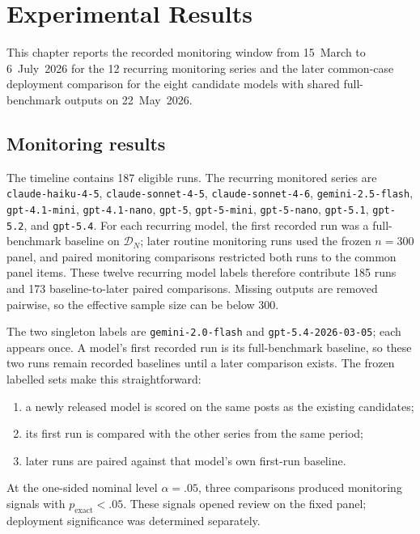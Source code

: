 \chapter{Experimental Results}
\label{chap:experimental-results}

This chapter reports the recorded monitoring window from 15~March to 6~July~2026 for the 12 recurring monitoring series and the later common-case deployment comparison for the eight candidate models with shared full-benchmark outputs on 22~May~2026.

\section{Monitoring results}
\label{sec:drift-results}

The timeline contains 187 eligible runs. The recurring monitored series are \texttt{claude-haiku-4-5}, \texttt{claude-sonnet-4-5}, \texttt{claude-sonnet-4-6}, \texttt{gemini-2.5-flash}, \texttt{gpt-4.1-mini}, \texttt{gpt-4.1-nano}, \texttt{gpt-5}, \texttt{gpt-5-mini}, \texttt{gpt-5-nano}, \texttt{gpt-5.1}, \texttt{gpt-5.2}, and \texttt{gpt-5.4}. For each recurring model, the first recorded run was a full-benchmark baseline on \(\mathcal{D}_N\); later routine monitoring runs used the frozen \(n=300\) panel, and paired monitoring comparisons restricted both runs to the common panel items. These twelve recurring model labels therefore contribute 185 runs and 173 baseline-to-later paired comparisons. Missing outputs are removed pairwise, so the effective sample size can be below 300.

The two singleton labels are \texttt{gemini-2.0-flash} and \texttt{gpt-5.4-2026-03-05}; each appears once. A model's first recorded run is its full-benchmark baseline, so these two runs remain recorded baselines until a later comparison exists. The frozen labelled sets make this straightforward:
\begin{enumerate}
    \item a newly released model is scored on the same posts as the existing candidates;
    \item its first run is compared with the other series from the same period;
    \item later runs are paired against that model's own first-run baseline.
\end{enumerate}

At the one-sided nominal level \(\alpha=.05\), three comparisons produced monitoring signals with \(p_{\mathrm{exact}}<.05\). These signals opened review on the fixed panel; deployment significance was determined separately.

